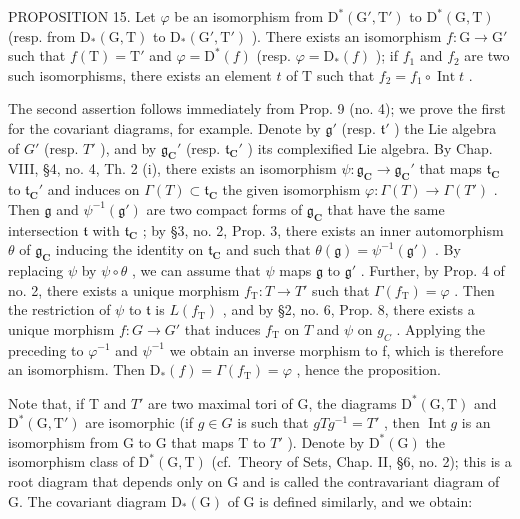PROPOSITION 15. Let \(\varphi\) be an isomorphism from \(\mathrm{D}^*(\mathrm{G}',\mathrm{T}')\) to \(\mathrm{D}^*(\mathrm{G},\mathrm{T})\) (resp. from \(\mathrm{D}_*(\mathrm{G},\mathrm{T})\) to \(\mathrm{D}_*(\mathrm{G}',\mathrm{T}')\) ). There exists an isomorphism \(f:\mathrm{G}\to \mathrm{G}'\) such that \(f(\mathrm{T}) = \mathrm{T}'\) and \(\varphi = \mathrm{D}^*(f)\) (resp. \(\varphi = \mathrm{D}_*(f)\) ); if \(f_{1}\) and \(f_{2}\) are two such isomorphisms, there exists an element \(t\) of \(\mathrm{T}\) such that \(f_{2} = f_{1}\circ \operatorname {Int}t\) .

The second assertion follows immediately from Prop. 9 (no. 4); we prove the first for the covariant diagrams, for example. Denote by \(\mathfrak{g}'\) (resp. \(\mathfrak{t}'\) ) the Lie algebra of \(G'\) (resp. \(T'\) ), and by \(\mathfrak{g}_{\mathbf{C}}'\) (resp. \(\mathfrak{t}_{\mathbf{C}}'\) ) its complexified Lie algebra. By Chap. VIII, §4, no. 4, Th. 2 (i), there exists an isomorphism \(\psi : \mathfrak{g}_{\mathbf{C}} \to \mathfrak{g}_{\mathbf{C}}'\) that maps \(\mathfrak{t}_{\mathbf{C}}\) to \(\mathfrak{t}_{\mathbf{C}}'\) and induces on \(\Gamma(T) \subset \mathfrak{t}_{\mathbf{C}}\) the given isomorphism \(\varphi : \Gamma(T) \to \Gamma(T')\) . Then \(\mathfrak{g}\) and \(\psi^{-1}(\mathfrak{g}')\) are two compact forms of \(\mathfrak{g}_{\mathbf{C}}\) that have the same intersection \(\mathfrak{t}\) with \(\mathfrak{t}_{\mathbf{C}}\) ; by §3, no. 2, Prop. 3, there exists an inner automorphism \(\theta\) of \(\mathfrak{g}_{\mathbf{C}}\) inducing the identity on \(\mathfrak{t}_{\mathbf{C}}\) and such that \(\theta(\mathfrak{g}) = \psi^{-1}(\mathfrak{g}')\) . By replacing \(\psi\) by \(\psi \circ \theta\) , we can assume that \(\psi\) maps \(\mathfrak{g}\) to \(\mathfrak{g}'\) . Further, by Prop. 4 of no. 2, there exists a unique morphism \(f_{\mathrm{T}} : T \to T'\) such that \(\Gamma(f_{\mathrm{T}}) = \varphi\) . Then the restriction of \(\psi\) to \(\mathfrak{t}\) is \(L(f_{\mathrm{T}})\) , and by §2, no. 6, Prop. 8, there exists a unique morphism \(f : G \to G'\) that induces \(f_{\mathrm{T}}\) on \(T\) and \(\psi\) on \(g_{C}\) . Applying the preceding to \(\varphi^{-1}\) and \(\psi^{-1}\) we obtain an inverse morphism to f, which is therefore an isomorphism. Then \(\mathrm{D}_{*}(f)=\Gamma(f_{\mathrm{T}})=\varphi\) , hence the proposition.

Note that, if T and \(T'\) are two maximal tori of G, the diagrams \(\mathrm{D}^{*}(\mathrm{G},\mathrm{T})\) and \(\mathrm{D}^{*}(\mathrm{G},\mathrm{T}')\) are isomorphic (if \(g \in G\) is such that \(gTg^{-1} = T'\) , then \(\operatorname{Int} g\) is an isomorphism from G to G that maps T to \(T'\) ). Denote by \(\mathrm{D}^{*}(\mathrm{G})\) the isomorphism class of \(\mathrm{D}^{*}(\mathrm{G},\mathrm{T})\) (cf.~Theory of Sets, Chap. II, §6, no. 2); this is a root diagram that depends only on G and is called the contravariant diagram of G. The covariant diagram \(\mathrm{D}_{*}(\mathrm{G})\) of G is defined similarly, and we obtain:

